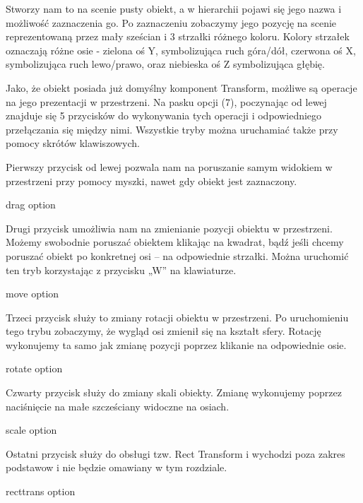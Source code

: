 \documentclass[brudnopis]{xmgr}
\begin{document}
Stworzy nam to na scenie pusty obiekt, a w hierarchii pojawi się jego nazwa i możliwość zaznaczenia go. Po zaznaczeniu zobaczymy jego pozycję na scenie reprezentowaną przez mały sześcian i 3 strzałki różnego koloru. Kolory strzałek oznaczają różne osie - zielona oś Y, symbolizująca ruch góra/dół, czerwona oś X, symbolizująca ruch lewo/prawo, oraz niebieska oś Z symbolizująca głębię. 

Jako, że obiekt posiada już domyślny komponent Transform, możliwe są operacje na jego prezentacji w przestrzeni. Na pasku opcji (7), poczynając od lewej znajduje się 5 przycisków do wykonywania tych operacji i odpowiedniego przełączania się między nimi. Wszystkie tryby można uruchamiać także  przy pomocy skrótów klawiszowych.

Pierwszy przycisk od lewej pozwala nam na poruszanie samym widokiem w przestrzeni przy pomocy myszki, nawet gdy obiekt jest zaznaczony. 

drag option

Drugi przycisk umożliwia nam na zmienianie pozycji obiektu w przestrzeni. Możemy swobodnie poruszać obiektem klikając na kwadrat, bądź jeśli chcemy poruszać obiekt po konkretnej osi – na odpowiednie strzałki. Można uruchomić ten tryb korzystając z przycisku „W” na klawiaturze.

move option

Trzeci przycisk służy to zmiany rotacji obiektu w przestrzeni. Po uruchomieniu tego trybu zobaczymy, że wygląd osi zmienił się na kształt sfery. Rotację wykonujemy ta samo jak zmianę pozycji poprzez klikanie na odpowiednie osie. 

rotate option

Czwarty przycisk służy do zmiany skali obiekty. Zmianę wykonujemy poprzez naciśnięcie na małe szcześciany widoczne na osiach.

scale option

Ostatni przycisk służy do obsługi tzw. Rect Transform i wychodzi poza zakres podstawow i nie będzie omawiany w tym rozdziale.

recttrans option
\end{document}
